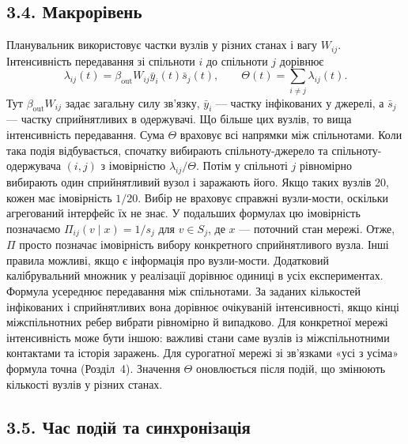 \documentclass[11pt,a4paper]{article}
\newcommand{\ibar}{\bar{y}}
\newcommand{\sbar}{\bar{s}}
\begin{document}
\subsection*{3.4. Макрорівень}

Планувальник використовує частки вузлів у різних станах і вагу $W_{ij}$. Інтенсивність передавання зі спільноти $i$ до спільноти $j$ дорівнює
\begin{equation*}\lambda_{ij}(t)=\beta_{\mathrm{out}}W_{ij}\ibar_i(t)\sbar_j(t),
\qquad \Theta(t)=\sum_{i\neq j}\lambda_{ij}(t).\tag{4}
\end{equation*}
Тут $\beta_{\mathrm{out}}W_{ij}$ задає загальну силу зв'язку, $\ibar_i$ --- частку інфікованих у джерелі, а $\sbar_j$ --- частку сприйнятливих в одержувачі. Що більше цих вузлів, то вища інтенсивність передавання. Сума $\Theta$ враховує всі напрямки між спільнотами.
Коли така подія відбувається, спочатку вибирають спільноту-джерело та спільноту-одержувача $(i,j)$ з імовірністю $\lambda_{ij}/\Theta$. Потім у спільноті $j$ рівномірно вибирають один сприйнятливий вузол і заражають його. Якщо таких вузлів 20, кожен має імовірність $1/20$. Вибір не враховує справжні вузли-мости, оскільки агрегований інтерфейс їх не знає. У подальших формулах цю імовірність позначаємо $\Pi_{ij}(v\mid x)=1/s_j$ для $v\in S_j$, де $x$ --- поточний стан мережі. Отже, $\Pi$ просто позначає імовірність вибору конкретного сприйнятливого вузла. Інші правила можливі, якщо є інформація про вузли-мости. Додатковий калібрувальний множник у реалізації дорівнює одиниці в усіх експериментах.
Формула усереднює передавання між спільнотами. За заданих кількостей інфікованих і сприйнятливих вона дорівнює очікуваній інтенсивності, якщо кінці міжспільнотних ребер вибрати рівномірно й випадково. Для конкретної мережі інтенсивність може бути іншою: важливі стани саме вузлів із міжспільнотними контактами та історія заражень. Для сурогатної мережі зі зв'язками «усі з усіма» формула точна (Розділ~4). Значення $\Theta$ оновлюється після подій, що змінюють кількості вузлів у різних станах.
\subsection*{3.5. Час подій та синхронізація}
\end{document}
